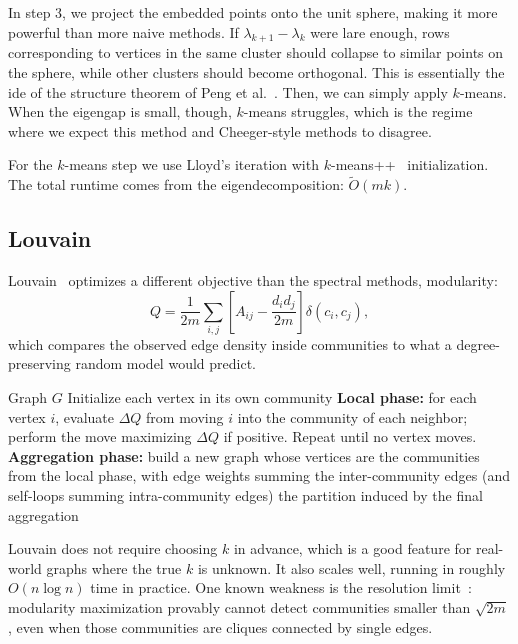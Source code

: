 \documentclass{article}
\theoremstyle{definition}
\theoremstyle{remark}
\begin{document}
In step 3, we project the embedded points onto the unit sphere, making it more powerful than more naive methods. If $\lambda_{k+1} - \lambda_k$ were lare enough, rows corresponding to vertices in the same cluster should collapse to similar points on the sphere, while other clusters should become orthogonal. This is essentially the ide of the structure theorem of Peng et al.~\cite{peng2015partitioning}. Then, we can simply apply $k$-means. When the eigengap is small, though, $k$-means struggles, which is the regime where we expect this method and Cheeger-style methods to disagree.

For the $k$-means step we use Lloyd's iteration with $k$-means++~\cite{arthur2007} initialization. The total runtime comes from the eigendecomposition: $\tilde O(mk)$.

\subsection{Louvain}

Louvain~\cite{blondel2008} optimizes a different objective than the spectral methods, modularity:
\[
Q = \frac{1}{2m} \sum_{i, j} \left[ A_{ij} - \frac{d_i d_j}{2m} \right] \delta(c_i, c_j),
\]
which compares the observed edge density inside communities to what a degree-preserving random  model would predict.

\begin{algorithm}[H]
\caption{Louvain}
\begin{algorithmic}[1]
\Require Graph $G$
\State Initialize each vertex in its own community
\Repeat
    \State \textbf{Local phase:} for each vertex $i$, evaluate $\Delta Q$ from moving $i$ into the community of each neighbor; perform the move maximizing $\Delta Q$ if positive. Repeat until no vertex moves.
    \State \textbf{Aggregation phase:} build a new graph whose vertices are the communities from the local phase, with edge weights summing the inter-community edges (and self-loops summing intra-community edges)
\State \Return the partition induced by the final aggregation
\end{algorithmic}
\end{algorithm}

Louvain does not require choosing $k$ in advance, which is a good feature for real-world graphs where the true $k$ is unknown. It also scales well, running in roughly $O(n \log n)$ time in practice. One known weakness is the resolution limit~\cite{fortunato2007}: modularity maximization provably cannot detect communities smaller than $\sqrt{2m}$, even when those communities are cliques connected by single edges.
\end{document}
